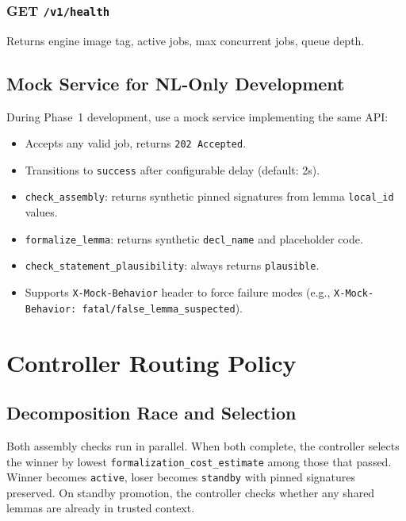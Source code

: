 \documentclass[11pt,a4paper]{article}
\begin{document}
\subsubsection{GET \texttt{/v1/health}}
Returns engine image tag, active jobs, max concurrent jobs, queue depth.

\subsection{Mock Service for NL-Only Development}
\label{sec:lean_mock}

During Phase~1 development, use a mock service implementing the same API:

\begin{itemize}[leftmargin=2em]
  \item Accepts any valid job, returns \texttt{202 Accepted}.
  \item Transitions to \texttt{success} after configurable delay (default: 2s).
  \item \texttt{check\_assembly}: returns synthetic pinned signatures from lemma \texttt{local\_id} values.
  \item \texttt{formalize\_lemma}: returns synthetic \texttt{decl\_name} and placeholder code.
  \item \texttt{check\_statement\_plausibility}: always returns \texttt{plausible}.
  \item Supports \texttt{X-Mock-Behavior} header to force failure modes (e.g., \texttt{X-Mock-Behavior: fatal/false\_lemma\_suspected}).
\end{itemize}

\section{Controller Routing Policy}

\subsection{Decomposition Race and Selection}

Both assembly checks run in parallel. When both complete, the controller selects the winner by lowest \texttt{formalization\_cost\_estimate} among those that passed. Winner becomes \texttt{active}, loser becomes \texttt{standby} with pinned signatures preserved. On standby promotion, the controller checks whether any shared lemmas are already in trusted context.
\end{document}
